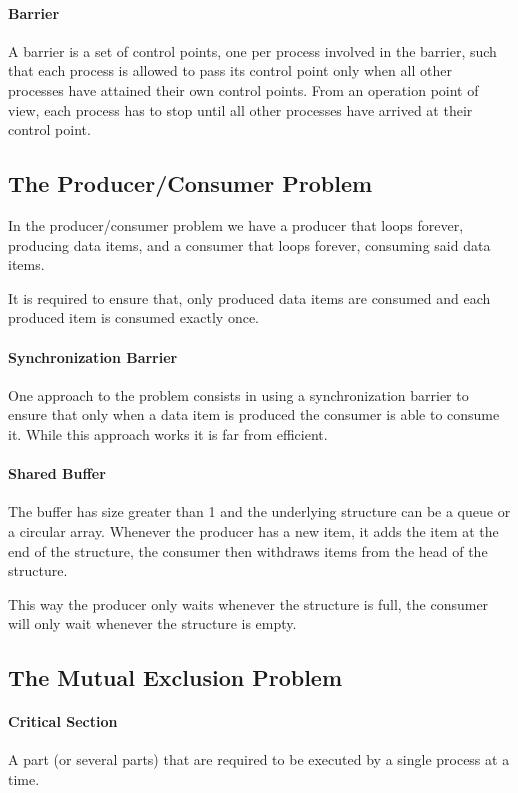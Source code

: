 \paragraph{Barrier}
A barrier is a set of control points, one per process involved in the barrier,
such that each process is allowed to pass its control point only when all other processes have attained their own control points.
From an operation point of view, each process has to stop until all other processes have arrived at their control point.

\subsection{The Producer/Consumer Problem}

In the producer/consumer problem we have a producer that loops forever, producing data items,
and a consumer that loops forever, consuming said data items.

It is required to ensure that,
only produced data items are consumed and each produced item is consumed exactly once.

\paragraph{Synchronization Barrier}
One approach to the problem consists in using a synchronization barrier to ensure that only when a data item is produced the consumer is able to consume it.
While this approach works it is far from efficient.

\paragraph{Shared Buffer}
The buffer has size greater than 1 and the underlying structure can be a queue or a circular array.
Whenever the producer has a new item, it adds the item at the end of the structure,
the consumer then withdraws items from the head of the structure.

This way the producer only waits whenever the structure is full,
the consumer will only wait whenever the structure is empty.

\subsection{The Mutual Exclusion Problem}

\paragraph{Critical Section}
A part (or several parts) that are required to be executed by a single process at a time.

